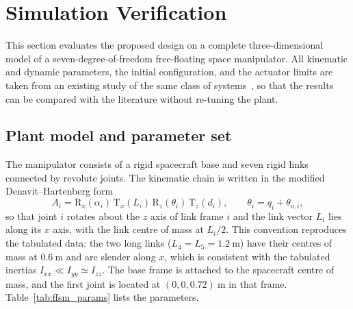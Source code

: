 \section{Simulation Verification}\label{sec:simulation}
This section evaluates the proposed design on a complete three-dimensional model of a seven-degree-of-freedom free-floating space manipulator. All kinematic and dynamic parameters, the initial configuration, and the actuator limits are taken from an existing study of the same class of systems~\cite{dou2025fractional}, so that the results can be compared with the literature without re-tuning the plant.

\subsection{Plant model and parameter set}
The manipulator consists of a rigid spacecraft base and seven rigid links connected by revolute joints. The kinematic chain is written in the modified Denavit--Hartenberg form
\begin{equation}
 A_i=\mathrm{R}_x(\alpha_i)\,\mathrm{T}_x(L_i)\,
     \mathrm{R}_z(\theta_i)\,\mathrm{T}_z(d_i),\qquad
 \theta_i=q_i+\theta_{o,i},
 \label{eq:mdh_chain}
\end{equation}
so that joint $i$ rotates about the $z$ axis of link frame $i$ and the link vector $L_i$ lies along its $x$ axis, with the link centre of mass at $L_i/2$. This convention reproduces the tabulated data: the two long links ($L_4=L_5=1.2~\mathrm{m}$) have their centres of mass at $0.6~\mathrm{m}$ and are slender along $x$, which is consistent with the tabulated inertias $I_{xx}\ll I_{yy}\simeq I_{zz}$. The base frame is attached to the spacecraft centre of mass, and the first joint is located at $(0,0,0.72)~\mathrm{m}$ in that frame. Table~\ref{tab:ffsm_params} lists the parameters.

